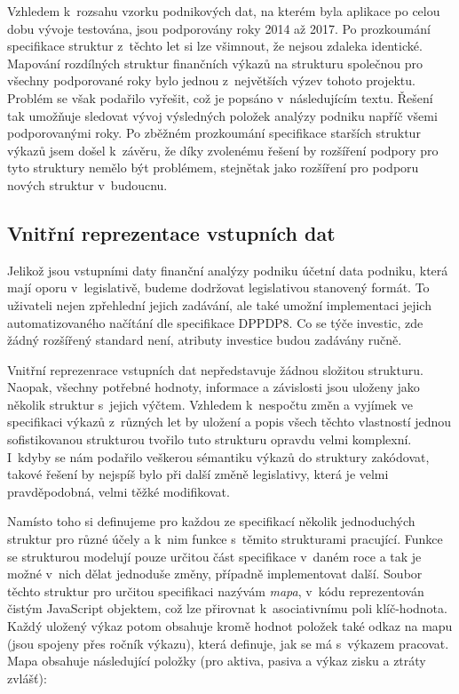 Vzhledem k~rozsahu vzorku podnikových dat, na kterém byla aplikace po celou dobu vývoje testována, jsou podporovány roky 2014 až 2017. Po prozkoumání specifikace struktur z~těchto let si lze všimnout, že nejsou zdaleka identické. Mapování rozdílných struktur finančních výkazů na strukturu společnou pro všechny podporované roky bylo jednou z~největších výzev tohoto projektu. Problém se však podařilo vyřešit, což je popsáno v~následujícím textu. Řešení tak umožňuje sledovat vývoj výsledných položek analýzy podniku napříč všemi podporovanými roky. Po zběžném prozkoumání specifikace starších struktur výkazů jsem došel k~závěru, že díky zvolenému řešení by rozšíření podpory pro tyto struktury nemělo být problémem, stejnětak jako rozšíření pro podporu nových struktur v~budoucnu.

\subsection{Vnitřní reprezentace vstupních dat}
Jelikož jsou vstupními daty finanční analýzy podniku účetní data podniku, která mají oporu v~legislativě, budeme dodržovat legislativou stanovený formát. To uživateli nejen zpřehlední jejich zadávání, ale také umožní implementaci jejich automatizovaného načítání dle specifikace DPPDP8. Co se týče investic, zde žádný rozšířený standard není, atributy investice budou zadávány ručně.

Vnitřní reprezenrace vstupních dat nepředstavuje žádnou složitou strukturu. Naopak, všechny potřebné hodnoty, informace a závislosti jsou uloženy jako několik struktur s~jejich výčtem. Vzhledem k~nespočtu změn a vyjímek ve specifikaci výkazů z~různých let by uložení a popis všech těchto vlastností jednou sofistikovanou strukturou tvořilo tuto strukturu opravdu velmi komplexní. I~kdyby se nám podařilo veškerou sémantiku výkazů do struktury zakódovat, takové řešení by nejspíš bylo při další změně legislativy, která je velmi pravděpodobná, velmi těžké modifikovat.

Namísto toho si definujeme pro každou ze specifikací několik jednoduchých struktur pro různé účely a k~nim funkce s~těmito strukturami pracující. Funkce se strukturou modelují pouze určitou část specifikace v~daném roce a tak je možné v~nich dělat jednoduše změny, případně implementovat další. Soubor těchto struktur pro určitou specifikaci nazývám \textit{mapa}, v~kódu reprezentován čistým JavaScript objektem, což lze přirovnat k~asociativnímu poli klíč-hodnota. Každý uložený výkaz potom obsahuje kromě hodnot položek také odkaz na mapu (jsou spojeny přes ročník výkazu), která definuje, jak se má s~výkazem pracovat. Mapa obsahuje následující položky (pro aktiva, pasiva a výkaz zisku a ztráty zvlášť):

